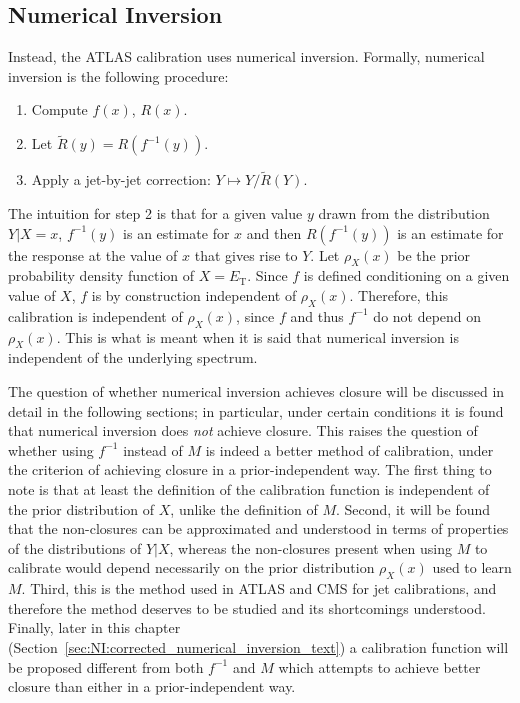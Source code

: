 \FloatBarrier

\subsection{Numerical Inversion}
\label{sec:NI:numinversion}
Instead, the ATLAS calibration uses numerical inversion. Formally, numerical inversion is the following procedure:

\begin{enumerate}
\item Compute $f(x)$, $R(x)$.  
\item Let $\tilde{R}(y) = R(f^{-1}(y))$.
\item Apply a jet-by-jet correction: $Y\mapsto Y/\tilde{R}(Y)$.
\end{enumerate}

The intuition for step 2 is that for a given value $y$ drawn from the distribution $Y|X=x$, $f^{-1}(y)$ is an estimate for $x$ and then $R(f^{-1}(y))$ is an estimate for the response at the value of $x$ that gives rise to $Y$.
Let $\rho_X(x)$ be the prior probability density function of $X=E_\text{T}$.
Since $f$ is defined conditioning on a given value of $X$, $f$ is by construction independent of $\rho_X(x)$.
Therefore, this calibration is independent of $\rho_X(x)$, since $f$ and thus $f^{-1}$ do not depend on $\rho_X(x)$.
This is what is meant when it is said that numerical inversion is independent of the underlying spectrum.

The question of whether numerical inversion achieves closure will be discussed in detail in the following sections; in particular, under certain conditions it is found that numerical inversion does \emph{not} achieve closure.
This raises the question of whether using $f^{-1}$ instead of $M$ is indeed a better method of calibration, under the criterion of achieving closure in a prior-independent way.
The first thing to note is that at least the definition of the calibration function is independent of the prior distribution of $X$, unlike the definition of $M$.
Second, it will be found that the non-closures can be approximated and understood in terms of properties of the distributions of $Y|X$, whereas the non-closures present when using $M$ to calibrate would depend necessarily on the prior distribution $\rho_X(x)$ used to learn $M$.
Third, this is the method used in ATLAS and CMS for jet calibrations, and therefore the method deserves to be studied and its shortcomings understood.
Finally, later in this chapter (Section~\ref{sec:NI:corrected_numerical_inversion_text}) a calibration function will be proposed different from both $f^{-1}$ and $M$ which attempts to achieve better closure than either in a prior-independent way.

